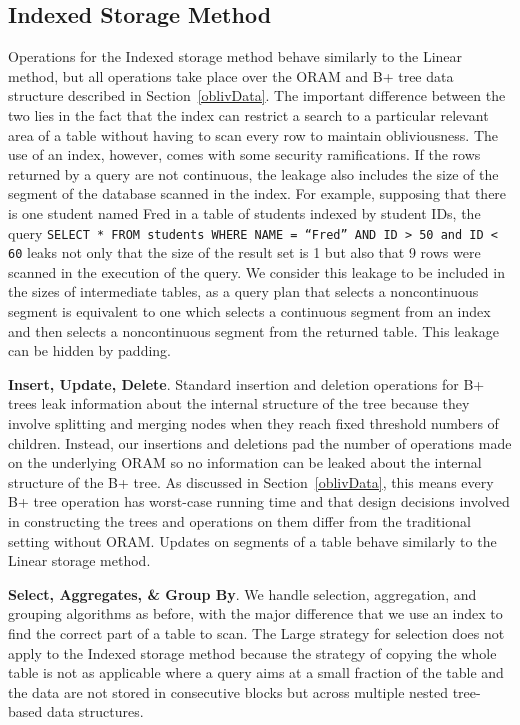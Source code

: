 \documentclass[letterpaper,twocolumn,10pt]{article}
\begin{document}
\subsection{Indexed Storage Method}
Operations for the Indexed storage method behave similarly to the Linear method, but all operations take place over the ORAM and B+ tree data structure described in Section~\ref{oblivData}. The important difference between the two lies in the fact that the index can restrict a search to a particular relevant area of a table without having to scan every row to maintain obliviousness. The use of an index, however, comes with some security ramifications. If the rows returned by a query are not continuous, the leakage also includes the size of the segment of the database scanned in the index. For example, supposing that there is one student named Fred in a table of students indexed by student IDs, the query \texttt{SELECT * FROM students WHERE NAME = ``Fred'' AND ID > 50 and ID < 60} leaks not only that the size of the result set is 1 but also that 9 rows were scanned in the execution of the query. We consider this leakage to be included in the sizes of intermediate tables, as a query plan that selects a noncontinuous segment is equivalent to one which selects a continuous segment from an index and then selects a noncontinuous segment from the returned table. This leakage can be hidden by padding.

  \noindent \textbf{Insert, Update, Delete}.
  Standard insertion and deletion operations for B+ trees leak information about the internal structure of the tree because they involve splitting and merging nodes when they reach fixed threshold numbers of children.
  Instead, our insertions and deletions pad the number of operations made on the underlying ORAM so no information can be leaked about the internal structure of the B+ tree. As discussed in Section~\ref{oblivData}, this means every B+ tree operation has worst-case running time and that design decisions involved in constructing the trees and operations on them differ from the traditional setting without ORAM. Updates on segments of a table behave similarly to the Linear storage method.

  \noindent \textbf{Select, Aggregates, \& Group By}.
We handle selection, aggregation, and grouping algorithms as before, with the major difference that we use an index to find the correct part of a table to scan. The Large strategy for selection does not apply to the Indexed storage method because the strategy of copying the whole table is not as applicable where a query aims at a small fraction of the table and the data are not stored in consecutive blocks but across multiple nested tree-based data structures.
\end{document}

